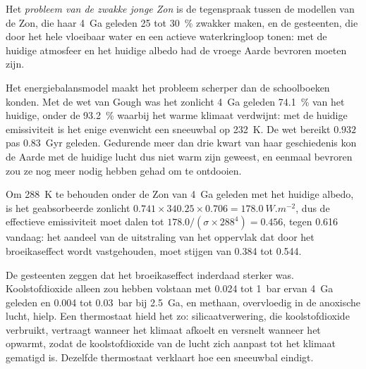 \begin{definition}\label{def:b2:precambrian-earth:faint-sun}
Het \emph{probleem van de zwakke jonge Zon} is de tegenspraak tussen
de modellen van de Zon, die haar \qty{4}{Ga} geleden 25 tot \qty{30}{\percent} zwakker maken, en de
gesteenten, die door het hele  vloeibaar water en een actieve waterkringloop tonen: met de huidige
atmosfeer en het huidige albedo had de vroege Aarde bevroren moeten zijn.
\end{definition}

Het energiebalansmodel maakt het probleem scherper dan de schoolboeken konden. Met de wet van Gough
was het zonlicht \qty{4}{Ga} geleden \qty{74.1}{\percent} van het huidige, onder de
\qty{93.2}{\percent} waarbij het warme klimaat verdwijnt: met de huidige emissiviteit is het enige
evenwicht een sneeuwbal op \qty{232}{K}. De wet bereikt $0.932$ pas
\qty{0.83}{Gyr} geleden. Gedurende meer dan drie kwart van haar geschiedenis kon de Aarde met
de huidige lucht dus niet warm zijn geweest, en eenmaal bevroren zou ze nog meer nodig hebben gehad om te ontdooien.

\begin{example}\label{ex:b2:precambrian-earth:young-greenhouse}
Om \qty{288}{K} te behouden onder de Zon van \qty{4}{Ga} geleden met het huidige albedo, is het geabsorbeerde
zonlicht $0.741\times340.25\times0.706 = \qty{178.0}{W.m^{-2}}$, dus de effectieve emissiviteit
moet dalen tot $178.0/(\sigma\times288^4) = 0.456$, tegen 0.616 vandaag: het aandeel van de
uitstraling van het oppervlak dat door het broeikaseffect wordt vastgehouden, moet stijgen van 0.384 tot 0.544.
\end{example}

De gesteenten zeggen dat het broeikaseffect inderdaad sterker was. Koolstofdioxide alleen zou hebben volstaan met
0.024 tot \qty{1}{bar} ervan \qty{4}{Ga} geleden en 0.004 tot \qty{0.03}{bar} bij \qty{2.5}{Ga}, en
methaan, overvloedig in de anoxische lucht, hielp. Een thermostaat hield het zo: silicaatverwering,
die koolstofdioxide verbruikt, vertraagt wanneer het klimaat afkoelt en versnelt wanneer het opwarmt, zodat de
koolstofdioxide van de lucht zich aanpast tot het klimaat gematigd is. Dezelfde thermostaat verklaart
hoe een sneeuwbal eindigt.


